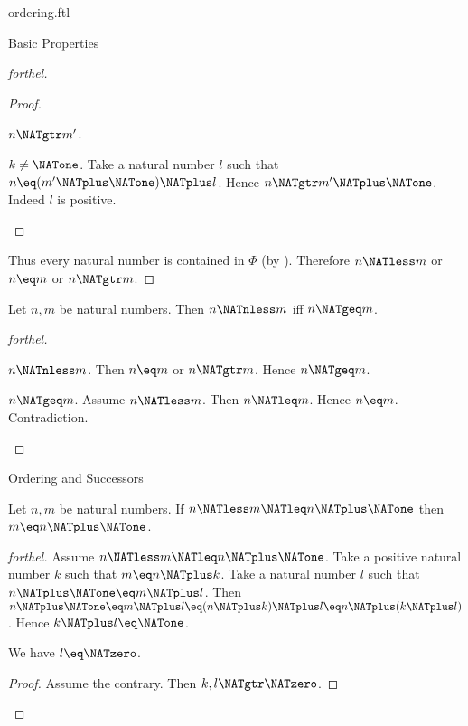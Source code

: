 \documentclass{naproche-library}
\begin{document}
\begin{smodule}[title=The Standard Ordering of the Natural Numbers]{ordering.ftl}
\begin{sfragment}{Basic Properties}
\begin{proof}[forthel]
\begin{proof}
\begin{case}{$n \NATgtr m'$.}
        \begin{case}{$k \neq \NATone$.}
          Take a natural number $l$ such that $n \eq (m' \NATplus \NATone) \NATplus l$.
          Hence $n \NATgtr m' \NATplus \NATone$.
          Indeed $l$ is positive.
        \end{case}
      \end{case}
    \end{proof}

    Thus every natural number is contained in $\Phi$ (by ).
    Therefore $n \NATless m$ or $n \eq m$ or $n \NATgtr m$.
  \end{proof}

  \begin{proposition}[forthel,id=ARITHMETIC_04_6991525988794368]
    Let $n, m$ be natural numbers.
    Then $n \NATnless m$ iff $n \NATgeq m$.
  \end{proposition}
  \begin{proof}[forthel]
    \begin{case}{$n \NATnless m$.}
      Then $n \eq m$ or $n \NATgtr m$.
      Hence $n \NATgeq m$.
    \end{case}

    \begin{case}{$n \NATgeq m$.}
      Assume $n \NATless m$.
      Then $n \NATleq m$.
      Hence $n \eq m$.
      Contradiction.
    \end{case}
  \end{proof}
\end{sfragment}

\begin{sfragment}{Ordering and Successors}
  \begin{proposition}[forthel,id=ARITHMETIC_04_7006203091615744]
    Let $n, m$ be natural numbers.
    If $n \NATless m \NATleq n \NATplus \NATone$ then $m \eq n \NATplus \NATone$.
  \end{proposition}
  \begin{proof}[forthel]
    Assume $n \NATless m \NATleq n \NATplus \NATone$.
    Take a positive natural number $k$ such that $m \eq n \NATplus k$.
    Take a natural number $l$ such that $n \NATplus \NATone \eq m \NATplus l$.
    Then $n \NATplus \NATone
      \eq m \NATplus l
      \eq (n \NATplus k) \NATplus l
      \eq n \NATplus (k \NATplus l)$.
    Hence $k \NATplus l \eq \NATone$.

    We have $l \eq \NATzero$.
    \begin{proof}
      Assume the contrary.
      Then $k,l \NATgtr \NATzero$.


\end{proof}
\end{proof}
\end{sfragment}
\end{smodule}
\end{document}

